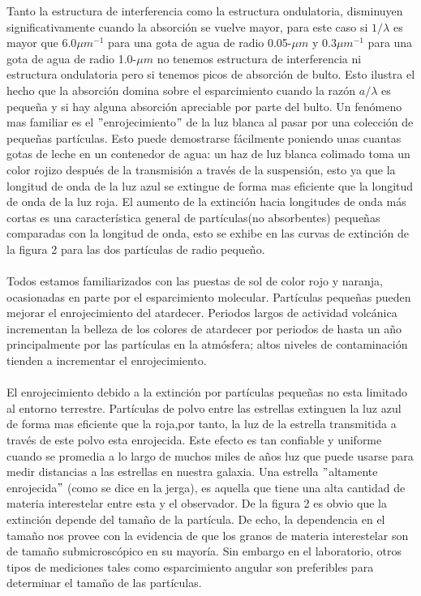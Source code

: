 \documentclass[11pt]{article}
\begin{document}
Tanto la estructura de interferencia como la estructura ondulatoria, disminuyen significativamente cuando la absorción se vuelve mayor, para este caso si $1/\lambda$ es mayor que 6.0$\mu m^{-1}$ para una gota de agua de radio 0.05-$\mu m$ y 0.3$\mu m^{-1}$ para una gota de agua de radio 1.0-$\mu m$ no tenemos estructura de interferencia ni estructura ondulatoria pero si tenemos picos de absorción de bulto. Esto ilustra el hecho que la absorción domina sobre el esparcimiento cuando la razón $a/\lambda$ es pequeña y si hay alguna absorción apreciable por parte del bulto. Un fenómeno mas familiar es el $"$enrojecimiento$"$ de la luz blanca al pasar por una colección de pequeñas partículas. Esto puede demostrarse fácilmente poniendo unas cuantas gotas de leche en un contenedor de agua: un haz de luz blanca colimado toma un color rojizo después de la transmisión a través de la suspensión, esto ya que la longitud de onda de la luz azul se extingue de forma mas eficiente que la longitud de onda de la luz roja. El aumento de la extinción hacia longitudes de onda más cortas es una característica general de partículas(no absorbentes) pequeñas comparadas con la longitud de onda, esto se exhibe en las curvas de extinción de la figura 2 para las dos partículas de radio pequeño. 
\\ \\
Todos estamos familiarizados con las puestas de sol de color rojo y naranja, ocasionadas en parte por el esparcimiento molecular. Partículas pequeñas pueden mejorar el enrojecimiento del atardecer. Periodos largos de actividad volcánica incrementan la belleza de los colores de atardecer por periodos de hasta un año principalmente por las partículas en la atmósfera; altos niveles de contaminación tienden a incrementar el enrojecimiento.
\\ \\
El enrojecimiento debido a la extinción por partículas pequeñas no esta limitado al entorno terrestre. Partículas de polvo entre las estrellas extinguen la luz azul de forma mas eficiente que la roja,por tanto, la luz de la estrella transmitida a través de este polvo esta enrojecida.
Este efecto es tan confiable y uniforme cuando se promedia a lo largo de muchos miles de años luz que puede usarse para medir distancias a las estrellas en nuestra galaxia. Una estrella $"$altamente enrojecida$"$ (como se dice en la jerga), es aquella que tiene una alta cantidad de materia interestelar entre esta y el observador. De la figura 2 es obvio que la extinción depende del tamaño de la partícula. De echo, la dependencia en el tamaño nos provee con la evidencia de que los granos de materia interestelar son de tamaño submicroscópico en su mayoría. Sin embargo en el laboratorio, otros tipos de mediciones tales como esparcimiento angular son preferibles para determinar el tamaño de las partículas.
\end{document}
